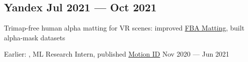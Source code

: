 

\subsection{Yandex \hfill Jul 2021 --- Oct 2021}
\begin{zitemize}
\item Trimap-free human alpha matting for VR scenes: improved \href{https://arxiv.org/pdf/2003.07711v1.pdf}{FBA Matting}, built alpha-mask datasets
\end{zitemize}

Earlier: , ML Research Intern, published \href{https://arxiv.org/abs/2302.01751}{Motion ID} \hfill Nov 2020 --- Jun 2021
